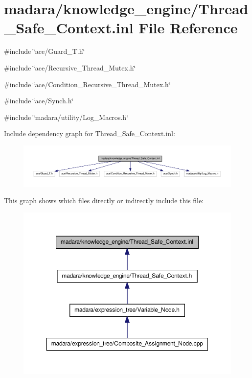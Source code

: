 \hypertarget{Thread__Safe__Context_8inl}{
\section{madara/knowledge\_\-engine/Thread\_\-Safe\_\-Context.inl File Reference}
\label{d8/dd5/Thread__Safe__Context_8inl}
}
{\ttfamily \#include \char`\"{}ace/Guard\_\-T.h\char`\"{}}\par
{\ttfamily \#include \char`\"{}ace/Recursive\_\-Thread\_\-Mutex.h\char`\"{}}\par
{\ttfamily \#include \char`\"{}ace/Condition\_\-Recursive\_\-Thread\_\-Mutex.h\char`\"{}}\par
{\ttfamily \#include \char`\"{}ace/Synch.h\char`\"{}}\par
{\ttfamily \#include \char`\"{}madara/utility/Log\_\-Macros.h\char`\"{}}\par
Include dependency graph for Thread\_\-Safe\_\-Context.inl:
\nopagebreak
\begin{figure}[H]
\begin{center}
\leavevmode
\includegraphics[width=400pt]{d4/d7c/Thread__Safe__Context_8inl__incl}
\end{center}
\end{figure}
This graph shows which files directly or indirectly include this file:
\nopagebreak
\begin{figure}[H]
\begin{center}
\leavevmode
\includegraphics[width=354pt]{de/d5b/Thread__Safe__Context_8inl__dep__incl}
\end{center}
\end{figure}
